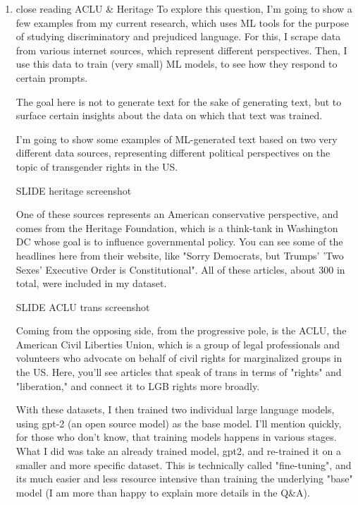 \documentclass[11pt]{article}
\begin{document}
\begin{enumerate}
The effect of prioritizing non-normative gender as an \emph{identity} that
is invisible, that is not immediately apparent despite being marked,
is to marginalize gender as \emph{expression}, which re-stigmatizes those
gender groups that already experience social stigma. Amin points to
feminized genders to make this point--the queen and the fairy, for
instance. Defining gender as an external expression or embodiment is
more likely to make visible and validate those gender which experience
stigamtization based precisely on how those genders present outwardly. 


\item close reading ACLU \& Heritage
\label{sec:orgdf0e340}
To explore this question, I'm going to show a few examples from my
current research, which uses ML tools for the purpose of studying
discriminatory and prejudiced language. For this, I scrape data from
various internet sources, which represent different perspectives.
Then, I use this data to train (very small) ML models, to see how they
respond to certain prompts.

The goal here is not to generate text for the sake of generating text,
but to surface certain insights about the data on which that text was
trained.

I'm going to show some examples of ML-generated text based on two very
different data sources, representing different political perspectives
on the topic of transgender rights in the US.

SLIDE heritage screenshot

One of these sources represents an American conservative perspective,
and comes from the Heritage Foundation, which is a think-tank in
Washington DC whose goal is to influence governmental policy. You can
see some of the headlines here from their website, like "Sorry
Democrats, but Trumps' 'Two Sexes' Executive Order is Constitutional".
All of these articles, about 300 in total, were included in my
dataset. 

SLIDE ACLU trans screenshot

Coming from the opposing side, from the progressive pole, is the ACLU,
the American Civil Liberties Union, which is a group of legal
professionals and volunteers who advocate on behalf of civil rights
for marginalized groups in the US. Here, you'll see articles that
speak of trans in terms of "rights" and "liberation," and connect it
to LGB rights more broadly.

With these datasets, I then trained two individual large language
models, using gpt-2 (an open source model) as the base model. I'll
mention quickly, for those who don't know, that training models
happens in various stages. What I did was take an already trained
model, gpt2, and re-trained it on a smaller and more specific dataset.
This is technically called "fine-tuning", and its much easier and less
resource intensive than training the underlying "base" model (I am
more than happy to explain more details in the Q\&A).


\end{enumerate}
\end{document}
